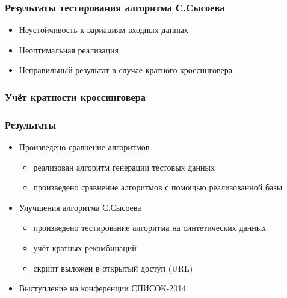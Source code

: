 \documentclass{beamer}
\begin{document}
\begin{frame}
  \frametitle{Результаты тестирования алгоритма С.Сысоева}
  \begin{itemize}
    \item Неустойчивость к вариациям входных данных
    \item Неоптимальная реализация
    \item Неправильный результат в случае кратного кроссинговера
  \end{itemize}
\end{frame}

\begin{frame}
  \frametitle{Учёт кратности кроссинговера}
\end{frame}

\begin{frame}
  \frametitle{Результаты}
  \begin{itemize}
  \item Произведено сравнение алгоритмов
    \begin{itemize}
      \item реализован алгоритм генерации тестовых данных
      \item произведено сравнение алгоритмов с помощью реализованной базы
    \end{itemize}
  \item Улучшения алгоритма С.Сысоева
    \begin{itemize}
      \item произведено тестирование алгоритма на синтетических данных
      \item учёт кратных рекомбинаций
      \item скрипт выложен в открытый доступ (URL)
    \end{itemize}
  \item Выступление на конференции СПИСОК-2014
  \end{itemize}
\end{frame}
\end{document}
